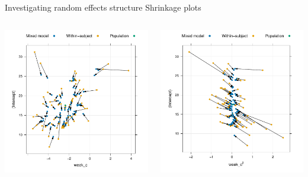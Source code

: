 \documentclass[aspectratio=169]{beamer}
\begin{document}
\begin{frame}[fragile]{Investigating random effects structure}
  {Shrinkage plots}
  \begin{columns}
    \begin{column}{.35\textwidth}
      \includegraphics[scale=.35]{../figures/hdrs_shrinkage_int-week_noncorr}
    \end{column}
    \begin{column}{.35\textwidth}
      \includegraphics[scale=.35]{../figures/hdrs_shrinkage_int-weeksq_noncorr}

\end{column}
\end{columns}
\end{frame}
\end{document}
